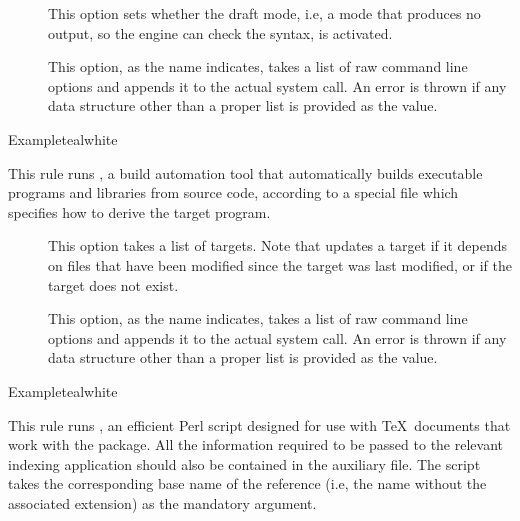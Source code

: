 \begin{description}
\begin{description}
\item[] This option sets whether the draft mode, i.e, a mode that produces no output, so the engine can check the syntax, is activated.

\item[] This option, as the name indicates, takes a list of raw command line options and appends it to the actual system call. An error is thrown if any data structure other than a proper list is provided as the value.
\end{description}

\begin{codebox}{Example}{teal}{\icnote}{white}
\end{codebox}

\item[\rulebox{make}]
This rule runs , a build automation tool that automatically builds executable programs and libraries from source code, according to a special file which specifies how to derive the target program.

\begin{description}
\item[] This option takes a list of targets. Note that  updates a target if it depends on files that have been modified since the target was last modified, or if the target does not exist.

\item[] This option, as the name indicates, takes a list of raw command line options and appends it to the actual system call. An error is thrown if any data structure other than a proper list is provided as the value.
\end{description}

\begin{codebox}{Example}{teal}{\icnote}{white}
\end{codebox}

\item[\rulebox{makeglossaries}]
This rule runs , an efficient Perl script designed for use with \TeX\ documents that work with the  package. All the information required to be passed to the relevant indexing application should also be contained in the auxiliary file. The script takes the corresponding base name of the  reference (i.e, the name without the associated extension) as the mandatory argument.


\end{description}

